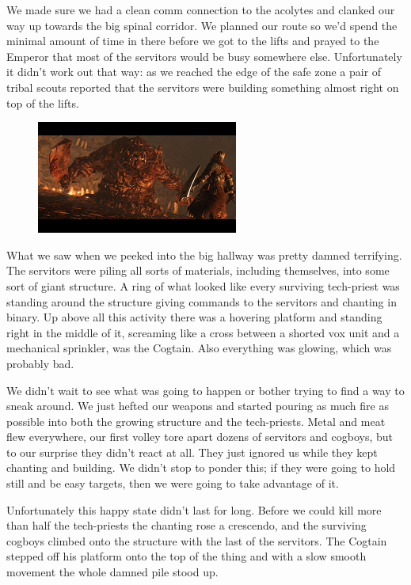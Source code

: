 We made sure we had a clean comm connection to the acolytes and clanked our way up towards the big spinal corridor. 
We planned our route so we’d spend the minimal amount of time in there before we got to the lifts and prayed to the Emperor that most of the servitors would be busy somewhere else. 
Unfortunately it didn’t work out that way: 
as we reached the edge of the safe zone a pair of tribal scouts reported that the servitors were building something almost right on top of the lifts.

\begin{figure}
	\begin{center}
		\includegraphics[width=\figwidth]{pics/7/42.png}
	\end{center}
\end{figure}
What we saw when we peeked into the big hallway was pretty damned terrifying. 
The servitors were piling all sorts of materials, including themselves, into some sort of giant structure. 
A ring of what looked like every surviving tech-priest was standing around the structure giving commands to the servitors and chanting in binary. 
Up above all this activity there was a hovering platform and standing right in the middle of it, screaming like a cross between a shorted vox unit and a mechanical sprinkler, was the Cogtain. 
Also everything was glowing, which was probably bad.

We didn’t wait to see what was going to happen or bother trying to find a way to sneak around. 
We just hefted our weapons and started pouring as much fire as possible into both the growing structure and the tech-priests. 
Metal and meat flew everywhere, our first volley tore apart dozens of servitors and cogboys, but to our surprise they didn’t react at all. 
They just ignored us while they kept chanting and building. 
We didn’t stop to ponder this; 
if they were going to hold still and be easy targets, then we were going to take advantage of it.

Unfortunately this happy state didn’t last for long. 
Before we could kill more than half the tech-priests the chanting rose a crescendo, and the surviving cogboys climbed onto the structure with the last of the servitors. 
The Cogtain stepped off his platform onto the top of the thing and with a slow smooth movement the whole damned pile stood up.

